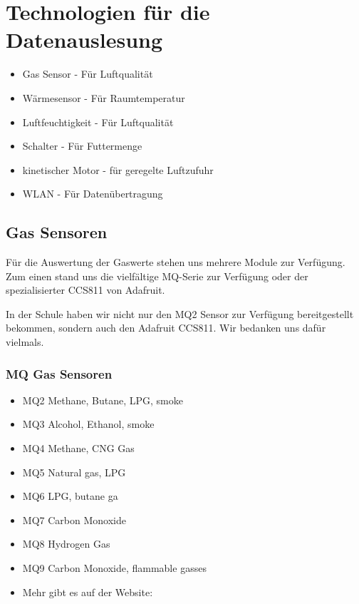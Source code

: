 \newpage
\def \currentAuthor{Kevin Glatz}


\section{Technologien für die Datenauslesung}

\begin{itemize}
	\item Gas Sensor - Für Luftqualität
	\item Wärmesensor - Für Raumtemperatur	
	\item Luftfeuchtigkeit - Für Luftqualität
	\item Schalter - Für Futtermenge
	\item kinetischer Motor - für geregelte Luftzufuhr
	\item WLAN - Für Datenübertragung

\end{itemize}

\subsection{Gas Sensoren}
Für die Auswertung der Gaswerte stehen uns mehrere Module zur Verfügung.  Zum einen stand uns die vielfältige MQ-Serie zur Verfügung oder der spezialisierter CCS811 von Adafruit. 

In der Schule haben wir nicht nur den MQ2 Sensor zur Verfügung bereitgestellt bekommen, sondern auch den Adafruit CCS811. Wir bedanken uns dafür vielmals.

\subsubsection{MQ Gas Sensoren}

\begin{itemize}
\item {MQ2}
	Methane, Butane, LPG, smoke
\item {MQ3}
	Alcohol, Ethanol, smoke
\item {MQ4}
	Methane, CNG Gas
\item {MQ5}
	Natural gas, LPG
\item {MQ6}
	LPG, butane ga
\item {MQ7}
	Carbon Monoxide
\item {MQ8}
	Hydrogen Gas
\item {MQ9}
	Carbon Monoxide, flammable gasses
\item Mehr gibt es auf der Website: \cite{MQ_Sensoren}
\end{itemize}



